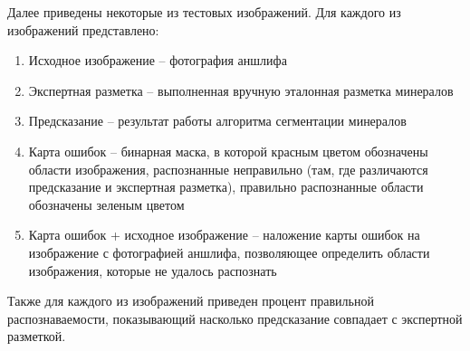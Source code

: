 \newpage
Далее приведены некоторые из тестовых изображений. Для каждого из изображений представлено:
\begin{enumerate}
    \item Исходное изображение -- фотография аншлифа
    \item Экспертная разметка -- выполненная вручную эталонная разметка минералов
    \item Предсказание -- результат работы алгоритма сегментации минералов
    \item Карта ошибок -- бинарная маска, в которой красным цветом обозначены области изображения, распознанные неправильно (там, где различаются предсказание и экспертная разметка), правильно распознанные области обозначены зеленым цветом
    \item Карта ошибок + исходное изображение -- наложение карты ошибок на изображение с фотографией аншлифа, позволяющее определить области изображения, которые не удалось распознать
\end{enumerate}{}
\par Также для каждого из изображений приведен процент правильной распознаваемости, показывающий насколько предсказание совпадает с экспертной разметкой.
\newpage

